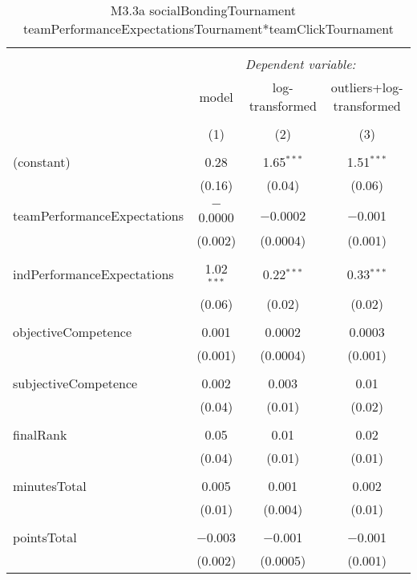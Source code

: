 
\begin{table}[!htbp] \centering 
  \caption{M3.3a socialBondingTournament ~ teamPerformanceExpectationsTournament*teamClickTournament} 
  \label{} 
\scriptsize 
\begin{tabular}{@{\extracolsep{5pt}}lccc} 
\\[-1.8ex]\hline 
\hline \\[-1.8ex] 
 & \multicolumn{3}{c}{\textit{Dependent variable:}} \\ 
\cline{2-4} 
 & model & log-transformed & outliers+log-transformed \\ 
\\[-1.8ex] & (1) & (2) & (3)\\ 
\hline \\[-1.8ex] 
 (constant) & 0.28 & 1.65$^{***}$ & 1.51$^{***}$ \\ 
  & (0.16) & (0.04) & (0.06) \\ 
  & & & \\ 
 teamPerformanceExpectations & $-$0.0000 & $-$0.0002 & $-$0.001 \\ 
  & (0.002) & (0.0004) & (0.001) \\ 
  & & & \\ 
 indPerformanceExpectations & 1.02$^{***}$ & 0.22$^{***}$ & 0.33$^{***}$ \\ 
  & (0.06) & (0.02) & (0.02) \\ 
  & & & \\ 
 objectiveCompetence & 0.001 & 0.0002 & 0.0003 \\ 
  & (0.001) & (0.0004) & (0.001) \\ 
  & & & \\ 
 subjectiveCompetence & 0.002 & 0.003 & 0.01 \\ 
  & (0.04) & (0.01) & (0.02) \\ 
  & & & \\ 
 finalRank & 0.05 & 0.01 & 0.02 \\ 
  & (0.04) & (0.01) & (0.01) \\ 
  & & & \\ 
 minutesTotal & 0.005 & 0.001 & 0.002 \\ 
  & (0.01) & (0.004) & (0.01) \\ 
  & & & \\ 
 pointsTotal & $-$0.003 & $-$0.001 & $-$0.001 \\ 
  & (0.002) & (0.0005) & (0.001) \\ 

\end{tabular}
\end{table}
